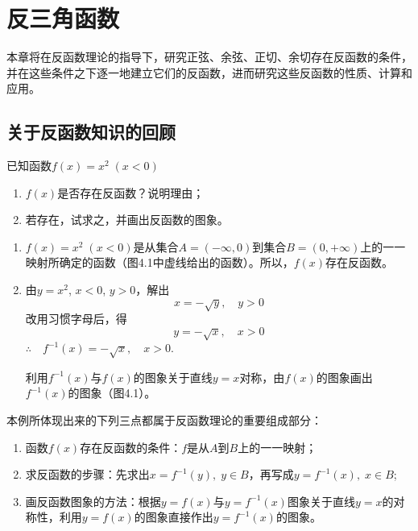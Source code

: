 \chapter{反三角函数}
本章将在反函数理论的指导下，研究正弦、余弦、正切、余切存在反函数的条件，并在这些条件之下逐一地建立它们的反函数，进而研究这些反函数的性质、计算和应用。

\section{关于反函数知识的回顾}
\begin{example}
    已知函数$f(x)=x^2\; (x<0)$
\begin{enumerate}[(1)]
    \item $f(x)$是否存在反函数？说明理由；
    \item 若存在，试求之，并画出反函数的图象。
\end{enumerate}
\end{example}

\begin{solution}
\begin{enumerate}[(1)]
\item $f(x)=x^2\; (x<0)$是从集合$A=(-\infty,0)$到集合$B=(0,+\infty)$上的一一映射所确定的函数（图4.1中虚线给出的函数）。所以，$f(x)$存在反函数。
\item 由$y=x^2$, $x<0$, $y>0$，解出
\[x=-\sqrt{y},\quad y>0\]
改用习惯字母后，得
\[y=-\sqrt{x},\quad x>0\]
$\therefore\quad f^{-1}(x)=-\sqrt{x},\quad x>0$.

利用$f^{-1}(x)$与$f(x)$的图象关于直线$y=x$对称，由$f(x)$的图象画出$f^{-1}(x)$的图象（图4.1）。
\end{enumerate}
\end{solution}

\begin{rmk}
    本例所体现出来的下列三点都属于反函数理论的重要组成部分：
\begin{enumerate}[(1)]
    \item 函数$f(x)$存在反函数的条件：$f$是从$A$到$B$上的一一映射；
    \item 求反函数的步骤：先求出$x=f^{-1}(y),\; y\in B$，再写成$y=f^{-1}(x),\; x\in B$;
    \item 画反函数图象的方法：根据$y=f(x)$与$y=f^{-1}(x)$图象关于直线$y=x$的对称性，利用$y=f(x)$的图象直接作出$y=f^{-1}(x)$的图象。
\end{enumerate}
\end{rmk}


